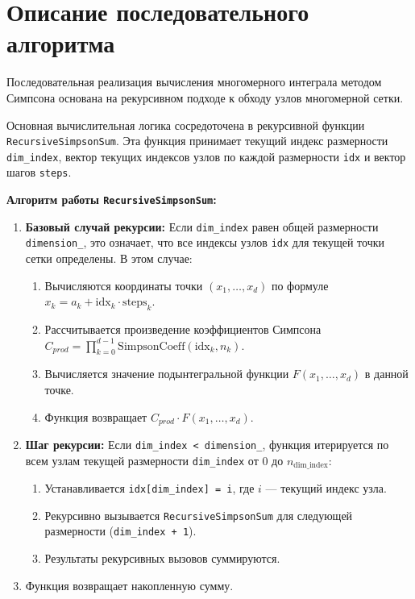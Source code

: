 \documentclass[a4paper,12pt]{article}
\begin{document}
\newpage

\section{Описание последовательного алгоритма}
\label{sec:sequential_algorithm}

Последовательная реализация вычисления многомерного интеграла методом Симпсона основана на рекурсивном подходе к обходу узлов многомерной сетки.

Основная вычислительная логика сосредоточена в рекурсивной функции \texttt{RecursiveSimpsonSum}. Эта функция принимает текущий индекс размерности \texttt{dim\_index}, вектор текущих индексов узлов по каждой размерности \texttt{idx} и вектор шагов \texttt{steps}.

\textbf{Алгоритм работы \texttt{RecursiveSimpsonSum}:}
\begin{enumerate}
    \item \textbf{Базовый случай рекурсии:} Если \texttt{dim\_index} равен общей размерности \texttt{dimension\_}, это означает, что все индексы узлов \texttt{idx} для текущей точки сетки определены. В этом случае:
        \begin{enumerate}
            \item Вычисляются координаты точки $(x_1, \dots, x_d)$ по формуле $x_k = a_k + \text{idx}_k \cdot \text{steps}_k$.
            \item Рассчитывается произведение коэффициентов Симпсона $C_{prod} = \prod_{k=0}^{d-1} \text{SimpsonCoeff}(\text{idx}_k, n_k)$.
            \item Вычисляется значение подынтегральной функции $F(x_1, \dots, x_d)$ в данной точке.
            \item Функция возвращает $C_{prod} \cdot F(x_1, \dots, x_d)$.
        \end{enumerate}
    \item \textbf{Шаг рекурсии:} Если \texttt{dim\_index < dimension\_}, функция итерируется по всем узлам текущей размерности \texttt{dim\_index} от $0$ до $n_{\text{dim\_index}}$:
        \begin{enumerate}
            \item Устанавливается \texttt{idx[dim\_index] = i}, где $i$ — текущий индекс узла.
            \item Рекурсивно вызывается \texttt{RecursiveSimpsonSum} для следующей размерности (\texttt{dim\_index + 1}).
            \item Результаты рекурсивных вызовов суммируются.
        \end{enumerate}
    \item Функция возвращает накопленную сумму.
\end{enumerate}
\end{document}
